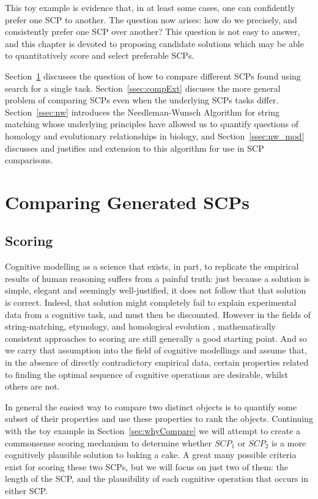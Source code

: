 This toy example is evidence that, in at least some cases, one can confidently prefer one SCP to another. The question now arises: how do we precisely, and consistently prefer one SCP over another? This question is not easy to answer, and this chapter is devoted to proposing candidate solutions which may be able to quantitatively score and select preferable SCPs.

Section~\ref{ssec:compGen} discusses the question of how to compare different SCPs found using search for a single task. Section~\ref{ssec:compExt} discuses the more general problem of comparing SCPs even when the underlying SCPs tasks differ. Section~\ref{ssec:nw} introduces the Needleman-Wunsch Algorithm for string matching whose underlying principles have allowed us to quantify questions of homology and evolutionary relationships in biology, and Section~\ref{ssec:nw_mod} discusses and justifies and extension to this algorithm for use in SCP comparisons.

\section{Comparing Generated SCPs} \label{ssec:compGen}
\subsection{Scoring}
Cognitive modelling as a science that exists, in part, to replicate the empirical results of human reasoning suffers from a painful truth: just because a solution is simple, elegant and seemingly well-justified, it does not follow that that solution is correct. Indeed, that solution might completely fail to explain experimental data from a cognitive task, and must then be discounted. However in the fields of string-matching, etymology, and homological evolution \citep{sweetser1990etymology} \citep{needleman1970general} , mathematically consistent approaches to scoring are still generally a good starting point. And so we carry that assumption into the field of cognitive modellings and assume that, in the absence of directly contradictory empirical data, certain properties related to finding the optimal sequence of cognitive operations are desirable, whilst others are not.

In general the easiest way to compare two distinct objects is to quantify some subset of their properties and use these properties to rank the objects. Continuing with the toy example in Section~\ref{sec:whyCompare} we will attempt to create a commonsense scoring mechanism to determine whether $SCP_1$ or $SCP_2$ is a more cognitively plausible solution to baking a cake. A great many possible criteria exist for scoring these two SCPs, but we will focus on just two of them: the length of the SCP, and the plausibility of each cognitive operation that occurs in either SCP.

